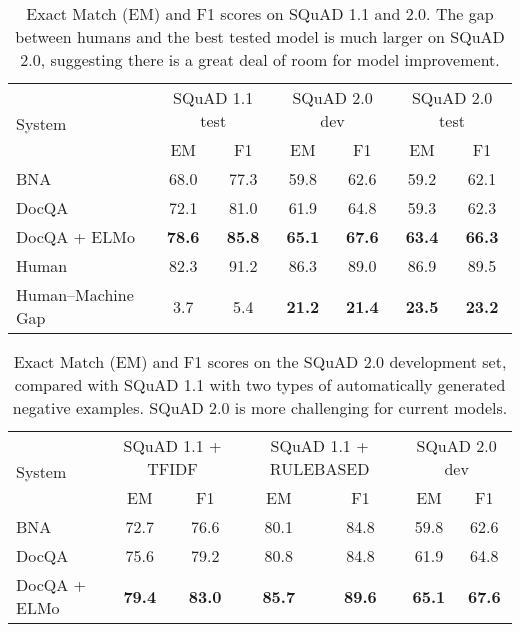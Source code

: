 \documentclass[a4paper, 11pt]{article}
\begin{document}
\begin{table}[h]
    \centering
    \begin{tabular}{|l|c c|c c|c c|}
    \hline
        \multirow{2}{*}{System} & \multicolumn{2}{c|}{SQuAD 1.1 test} & \multicolumn{2}{c|}{SQuAD 2.0 dev} & \multicolumn{2}{c|}{SQuAD 2.0 test}\\
         & EM & F1 & EM & F1 & EM & F1 \\
        \hline
        BNA & 68.0 & 77.3 & 59.8 & 62.6 & 59.2 & 62.1\\
        DocQA & 72.1 & 81.0 & 61.9 & 64.8 & 59.3 & 62.3\\
        DocQA + ELMo & \textbf{78.6} & \textbf{85.8} & \textbf{65.1} & \textbf{67.6} & \textbf{63.4} & \textbf{66.3}\\
        \hline
        Human & 82.3 & 91.2 & 86.3 & 89.0 & 86.9 & 89.5\\
        Human–Machine Gap & 3.7 & 5.4 & \textbf{21.2} & \textbf{21.4} & \textbf{23.5} & \textbf{23.2} \\
        \hline
    \end{tabular}
    \caption{Exact Match (EM) and F1 scores on SQuAD 1.1 and 2.0. The gap between humans and the best tested model is much larger on SQuAD 2.0, suggesting there is a great deal of room for model improvement.}
\end{table}

\begin{table}[h]
    \centering
    \begin{tabular}{|l|c c|c c|c c|}
    \hline
        \multirow{2}{*}{System} & \multicolumn{2}{c|}{SQuAD 1.1 + TFIDF} & \multicolumn{2}{c|}{SQuAD 1.1 + RULEBASED} & \multicolumn{2}{c|}{SQuAD 2.0 dev}\\
         & EM & F1 & EM & F1 & EM & F1 \\
        \hline
        BNA & 72.7 & 76.6 & 80.1 & 84.8 & 59.8 & 62.6\\
        DocQA & 75.6 & 79.2 & 80.8 & 84.8 & 61.9 & 64.8\\
        DocQA + ELMo & \textbf{79.4} & \textbf{83.0} & \textbf{85.7} & \textbf{89.6} & \textbf{65.1} & \textbf{67.6}\\
        \hline
    \end{tabular}
    \caption{Exact Match (EM) and F1 scores on the SQuAD 2.0 development set, compared with SQuAD 1.1 with two types of automatically generated negative examples. SQuAD 2.0 is more challenging for current models.}
\end{table}
\end{document}
